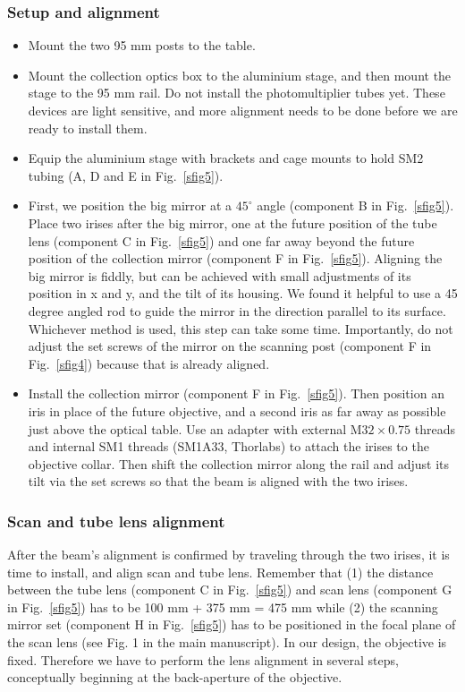 \documentclass[10pt,letterpaper]{article}
\begin{document}
\subsubsection{Setup and alignment}

\begin{itemize}
    \item Mount the two 95 mm posts to the table.
    \item Mount the collection optics box to the aluminium stage, and then mount the stage to the 95 mm rail. Do not install the photomultiplier tubes yet. These devices are light sensitive, and more alignment needs to be done before we are ready to install them.
    \item Equip the aluminium stage with brackets and cage mounts to hold SM2 tubing (A, D and E in Fig.~\ref{sfig5}).
    \item First, we position the big mirror at a $45^\circ$ angle (component B in Fig.~\ref{sfig5}). Place two irises after the big mirror, one at the future position of the tube lens (component C in Fig.~\ref{sfig5}) and one far away beyond the future position of the collection mirror (component F in Fig.~\ref{sfig5}). Aligning the big mirror is fiddly, but can be achieved with small adjustments of its position in x and y, and the tilt of its housing. We found it helpful to use a 45 degree angled rod to guide the mirror in the direction parallel to its surface. Whichever method is used, this step can take some time. Importantly, do not adjust the set screws of the mirror on the scanning post (component F in Fig.~\ref{sfig4}) because that is already aligned.
    \item Install the collection mirror (component F in Fig.~\ref{sfig5}). Then position an iris in place of the future objective, and a second iris as far away as possible just above the optical table. Use an adapter with external $\text{M}32\times0.75$ threads and internal SM1 threads (SM1A33, Thorlabs) to attach the irises to the objective collar. Then shift the collection mirror along the rail and adjust its tilt via the set screws so that the beam is aligned with the two irises.
\end{itemize}

\subsubsection{Scan and tube lens alignment}

After the beam's alignment is confirmed by traveling through the two irises, it is time to install, and align scan and tube lens. Remember that (1) the distance between the tube lens (component C in Fig.~\ref{sfig5}) and scan lens (component G in Fig.~\ref{sfig5}) has to be 100 mm + 375 mm = 475 mm while (2) the scanning mirror set (component H in Fig.~\ref{sfig5}) has to be positioned in the focal plane of the scan lens (see Fig. 1 in the main manuscript). In our design, the objective is fixed. Therefore we have to perform the lens alignment in several steps, conceptually beginning at the back-aperture of the objective. 
\end{document}
